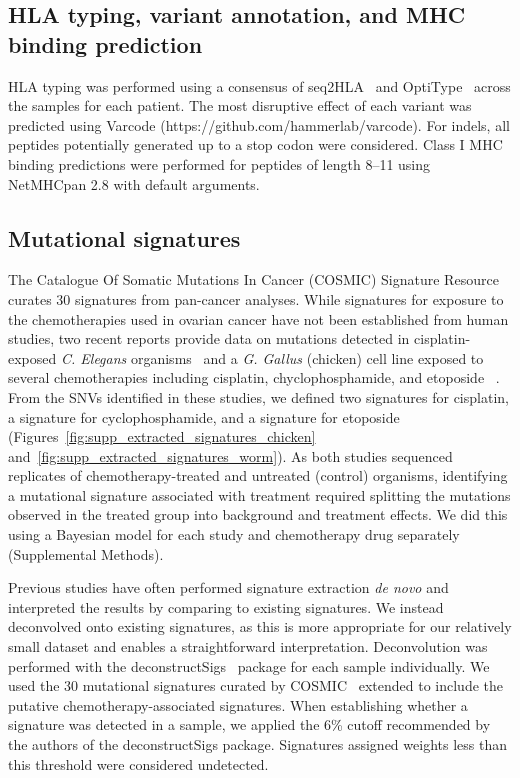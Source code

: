 \subsection*{HLA typing, variant annotation, and MHC binding prediction}
\begin{sloppypar}
HLA typing was performed using a consensus of seq2HLA~\cite{Boegel_2012} and OptiType~\cite{Szolek_2014} across the samples for each patient. The most disruptive effect of each variant was predicted using Varcode (https://github.com/hammerlab/varcode). For indels, all peptides potentially generated up to a stop codon were considered. Class I MHC binding predictions were performed for peptides of length 8--11 using NetMHCpan 2.8\cite{Lundegaard_2008} with default arguments.
\end{sloppypar}

\subsection*{Mutational signatures}
The Catalogue Of Somatic Mutations In Cancer (COSMIC) Signature Resource curates 30 signatures from pan-cancer analyses. While signatures for exposure to the chemotherapies used in ovarian cancer have not been established from human studies, two recent reports provide data on mutations detected in cisplatin-exposed \textit{C. Elegans} organisms~\cite{Meier_2014} and a \textit{G. Gallus} (chicken) cell line exposed to several chemotherapies including cisplatin, chyclophosphamide, and etoposide ~\cite{Szikriszt_2016}. From the SNVs identified in these studies, we defined two signatures for cisplatin, a signature for cyclophosphamide, and a signature for etoposide (Figures~\ref{fig:supp_extracted_signatures_chicken} and~\ref{fig:supp_extracted_signatures_worm}). As both studies sequenced replicates of chemotherapy-treated and untreated (control) organisms, identifying a mutational signature associated with treatment required splitting the mutations observed in the treated group into background and treatment effects. We did this using a Bayesian model for each study and chemotherapy drug separately (Supplemental Methods).

Previous studies have often performed signature extraction \textit{de novo} and interpreted the results by comparing to existing signatures. We instead deconvolved onto existing signatures, as this is more appropriate for our relatively small dataset and enables a straightforward interpretation. Deconvolution was performed with the deconstructSigs~\cite{Rosenthal_2016} package for each sample individually. We used the 30 mutational signatures curated by COSMIC~\cite{364242} extended to include the putative chemotherapy-associated signatures. When establishing whether a signature was detected in a sample, we applied the 6\% cutoff recommended by the authors of the deconstructSigs package. Signatures assigned weights less than this threshold were considered undetected.
